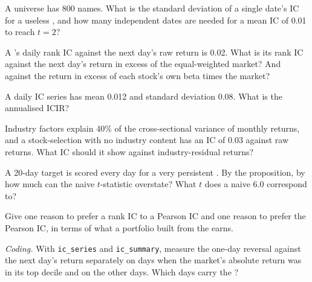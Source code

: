 \begin{exercise}[$\star$]\label{exo:rs:anatomy-of-a-predictor:1}
A universe has 800 names. What is the standard deviation of a single date's IC for a useless , and how many independent
dates are needed for a mean IC of 0.01 to reach $t = 2$?
\end{exercise}

\begin{exercise}[$\star$]\label{exo:rs:anatomy-of-a-predictor:2}
A 's daily rank IC against the next day's raw return is 0.02. What is its rank IC against the next day's return in
excess of the equal-weighted market? And against the return in excess of each stock's own beta times the market?
\end{exercise}

\begin{exercise}[$\star$]\label{exo:rs:anatomy-of-a-predictor:3}
A daily IC series has mean 0.012 and standard deviation 0.08. What is the annualised ICIR?
\end{exercise}

\begin{exercise}[$\star\star$]\label{exo:rs:anatomy-of-a-predictor:4}
Industry factors explain 40\% of the cross-sectional variance of monthly returns, and a stock-selection  with no industry
content has an IC of 0.03 against raw returns. What IC should it show against industry-residual returns?
\end{exercise}

\begin{exercise}[$\star\star$]\label{exo:rs:anatomy-of-a-predictor:5}
A 20-day target is scored every day for a very persistent . By the proposition, by how much can the naive $t$-statistic
overstate? What $t$ does a naive 6.0 correspond to?
\end{exercise}

\begin{exercise}[$\star\star$]\label{exo:rs:anatomy-of-a-predictor:6}
Give one reason to prefer a rank IC to a Pearson IC and one reason to prefer the Pearson IC, in terms of what a portfolio built from
the  earns.
\end{exercise}

\begin{exercise}[$\star\star\star$]\label{exo:rs:anatomy-of-a-predictor:7}
\emph{Coding.} With \texttt{ic\_series} and \texttt{ic\_summary}, measure the one-day reversal against the next day's return
separately on days when the market's absolute return was in its top decile and on the other days. Which days carry the ?
\end{exercise}

